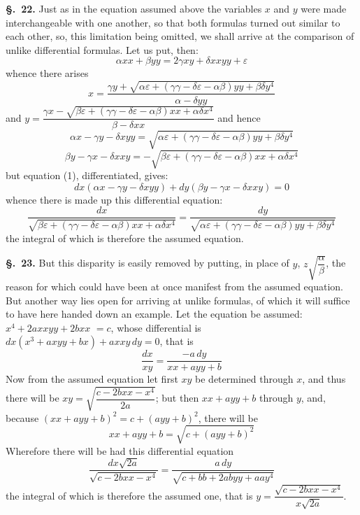 \documentclass{article}
\begin{document}
\textbf{§.~22.} Just as in the equation assumed above the variables $x$ and $y$ were made
interchangeable with one another, so that both formulas turned out similar to each other, so, this
limitation being omitted, we shall arrive at the comparison of unlike differential formulas. Let us
put, then:
\[ \alpha xx + \beta yy = 2\gamma xy + \delta xxyy + \varepsilon \tag{1} \]
whence there arises
\[ x = \frac{\gamma y + \sqrt{\alpha\varepsilon + (\gamma\gamma - \delta\varepsilon - \alpha\beta)yy + \beta\delta y^{4}}}{\alpha - \delta yy} \]
and $y = \dfrac{\gamma x - \sqrt{\beta\varepsilon + (\gamma\gamma - \delta\varepsilon - \alpha\beta)xx + \alpha\delta x^{4}}}{\beta - \delta xx}$
and hence
\[ \alpha x - \gamma y - \delta xyy = \sqrt{\alpha\varepsilon + (\gamma\gamma - \delta\varepsilon - \alpha\beta)yy + \beta\delta y^{4}} \tag{2} \]
\[ \beta y - \gamma x - \delta xxy = -\sqrt{\beta\varepsilon + (\gamma\gamma - \delta\varepsilon - \alpha\beta)xx + \alpha\delta x^{4}} \tag{3} \]
but equation (1), differentiated, gives:
\[ dx(\alpha x - \gamma y - \delta xyy) + dy(\beta y - \gamma x - \delta xxy) = 0 \]
whence there is made up this differential equation:
\[ \frac{dx}{\sqrt{\beta\varepsilon + (\gamma\gamma - \delta\varepsilon - \alpha\beta)xx + \alpha\delta x^{4}}}
   = \frac{dy}{\sqrt{\alpha\varepsilon + (\gamma\gamma - \delta\varepsilon - \alpha\beta)yy + \beta\delta y^{4}}} \]
the integral of which is therefore the assumed equation.

\textbf{§.~23.} But this disparity is easily removed by putting, in place of $y$,
$z\sqrt{\dfrac{\alpha}{\beta}}$,
the reason for which could have been at once manifest from the assumed equation. But another way
lies open for arriving at unlike formulas, of which it will suffice to have here handed down an
example. Let the equation be assumed:
$x^{4} + 2axxyy + 2bxx$
${}= c$, whose differential is $dx(x^{3} + axyy + bx) + axxy\,dy = 0$, that is
\[ \frac{dx}{xy} = \frac{-a\,dy}{xx + ayy + b} \]
Now from the assumed equation let first $xy$ be determined through $x$, and thus there will be
$xy = \sqrt{\dfrac{c - 2bxx - x^{4}}{2a}}$; but then $xx + ayy + b$ through $y$, and, because
$(xx + ayy + b)^{2} = c + (ayy + b)^{2}$, there will be
\[ xx + ayy + b = \sqrt{c + (ayy + b)^{2}} \]
Wherefore there will be had this differential equation
\[ \frac{dx\sqrt{2a}}{\sqrt{c - 2bxx - x^{4}}} = \frac{a\,dy}{\sqrt{c + bb + 2abyy + aay^{4}}} \]
the integral of which is therefore the assumed one, that is $y = \dfrac{\sqrt{c - 2bxx - x^{4}}}{x\sqrt{2a}}$.
\end{document}
